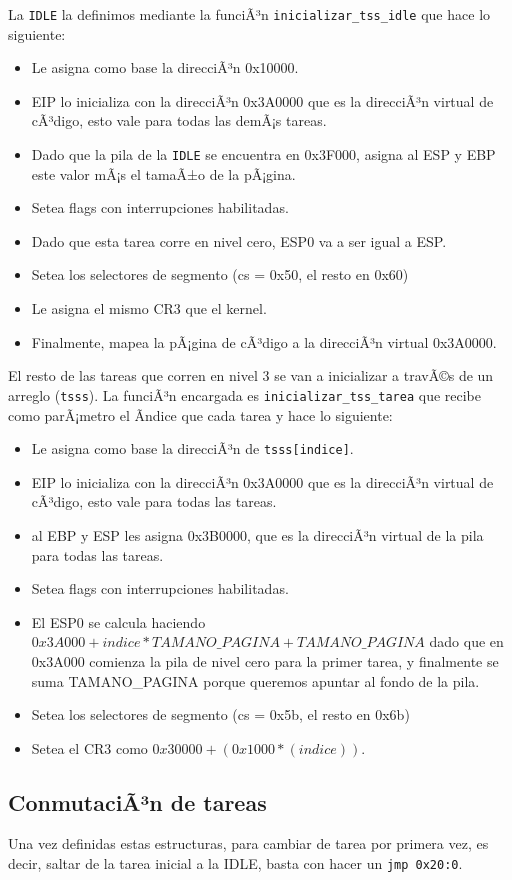 \documentclass[10pt, a4paper]{article}
\begin{document}
La \texttt{IDLE} la definimos mediante la funciÃ³n \texttt{inicializar\_tss\_idle} que hace lo siguiente:
\begin{itemize}
\item Le asigna como base la direcciÃ³n 0x10000.
\item EIP lo inicializa con la direcciÃ³n 0x3A0000 que es la direcciÃ³n virtual de cÃ³digo, esto vale para todas las demÃ¡s tareas.
\item Dado que la pila de la \texttt{IDLE} se encuentra en 0x3F000, asigna al ESP y EBP este valor mÃ¡s el tamaÃ±o de la pÃ¡gina.
\item Setea flags con interrupciones habilitadas.
\item Dado que esta tarea corre en nivel cero, ESP0 va a ser igual a ESP.
\item Setea los selectores de segmento (cs = 0x50, el resto en 0x60)
\item Le asigna el mismo CR3 que el kernel.
\item Finalmente, mapea la pÃ¡gina de cÃ³digo a la direcciÃ³n virtual 0x3A0000.
\end{itemize} 
El resto de las tareas que corren en nivel 3 se van a inicializar a travÃ©s de un arreglo (\texttt{tsss}).
La funciÃ³n encargada es \texttt{inicializar\_tss\_tarea} que recibe como parÃ¡metro el Ã­ndice que cada tarea 
y hace lo siguiente:
\begin{itemize}
\item Le asigna como base la direcciÃ³n de \texttt{tsss[indice]}.
\item EIP lo inicializa con la direcciÃ³n 0x3A0000 que es la direcciÃ³n virtual de cÃ³digo, esto vale para todas las tareas.
\item al EBP y ESP les asigna 0x3B0000, que es la direcciÃ³n virtual de la pila para todas las tareas.
\item Setea flags con interrupciones habilitadas.
\item El ESP0 se calcula haciendo \texttt{$0x3A000 + indice*TAMANO\_PAGINA +TAMANO\_PAGINA$} dado que en 0x3A000 comienza la pila de nivel cero para la primer
tarea, y finalmente se suma TAMANO\_PAGINA porque queremos apuntar al fondo de la pila.
\item Setea los selectores de segmento (cs = 0x5b, el resto en 0x6b)
\item Setea el CR3 como \texttt{$0x30000+(0x1000*(indice))$}.
\end{itemize}

\subsection{ConmutaciÃ³n de tareas}
Una vez definidas estas estructuras, para cambiar de tarea por primera vez, es decir, saltar de la tarea inicial a la IDLE, basta con hacer un \texttt{jmp 0x20:0}.
\newpage
\end{document}
